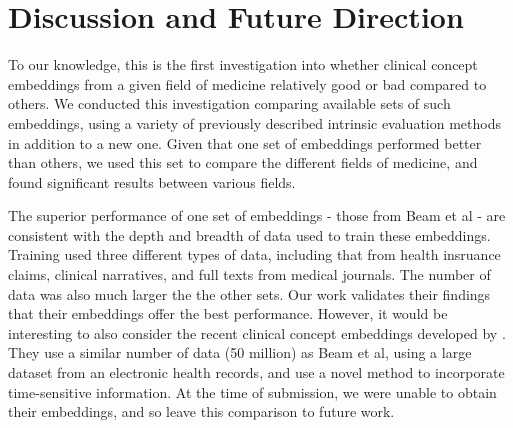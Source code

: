 \documentclass[11pt,a4paper]{article}
\def\blu#1{{\textbf{\color{blu}#1}}}
\def\ora#1{{\textbf{\color{ora}#1}}}
\begin{document}

\section{Discussion and Future Direction}
To our knowledge, this is the first investigation into whether clinical concept embeddings from a given field of medicine relatively good or bad compared to others. We conducted this investigation comparing available sets of such embeddings, using a variety of previously described intrinsic evaluation methods in addition to a new one. Given that one set of embeddings performed better than others, we used this set to compare the different fields of medicine, and found significant results between various fields. 

The superior performance of one set of embeddings - those from Beam et al  - are consistent with the depth and breadth of data used to train these embeddings. Training used three different types of data, including that from health insruance claims, clinical narratives, and full texts from medical journals. The number of data was also much larger the the other sets. Our work validates their findings that their embeddings offer the best performance. However, it would be interesting to also consider the recent clinical concept embeddings developed by \cite{xiangTimesensitiveClinicalConcept2019}. They use a similar number of data (50 million) as Beam et al, using a large dataset from an electronic health records, and use a novel method to incorporate time-sensitive information. At the time of submission, we were unable to obtain their embeddings, and so leave this comparison to future work.
\end{document}
